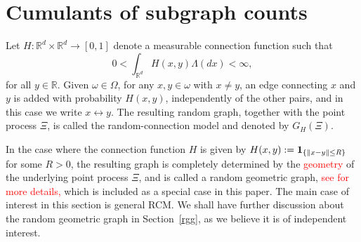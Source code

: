 \documentclass[12pt]{article}
\newcommand{\R}{\mathbb{R}}
\newcommand{\bone}{{\bf 1}}
\def\real{{\mathord{\mathbb R}}}
\numberwithin{equation}{section}
\begin{document}
\section{Cumulants of subgraph counts} %
\label{s5}
\noindent
 Let 
 $H:\R^d\times\R^d\to[0,1]$ 
 denote a %
 measurable connection function such that
 \begin{equation}
 \nonumber %
0<\int_{\real^d}H(x,y) \Lambda(dx)< \infty, 
\end{equation}
 for all $y \in\R$. 
 Given $\omega \in \Omega$, for any $x,y\in\omega$ with $x\not= y$,
 an edge connecting $x$ and $y$ is added with probability $H(x,y)$,
 independently of the other pairs, and in this case we write $x \leftrightarrow y$.
 The resulting random graph, together with the point process $\Xi$,
 is called the random-connection model and denoted by $G_H(\Xi)$.

 \medskip

 In the case where the connection function $H$ is given by $H(x,y) := \bone_{\{\|x-y\|\leq R\}}$ for some $R>0$, the resulting graph is completely determined by the \textcolor{red}{geometry} of the underlying point process $\Xi$, and is called a random geometric graph, \textcolor{red}{see \cite{penrosebk} for more details,}
 which is included as a special case in this paper. The main case of interest in this section is general RCM. We shall have further discussion about the random geometric graph in Section~\ref{rgg}, as we believe it is of independent interest. 

\medskip
\end{document}
